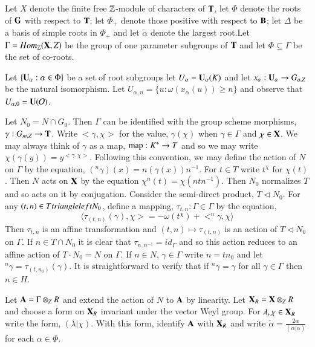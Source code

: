 Let $X$ denote the finite free $\mathbb{Z}$-module of characters of $\mathbf{T}$, let $\Phi$ denote the roots of $\mathbf{G}$ with respect to $\mathbf{T}$;  let $\Phi_{+}$ denote those positive with respect to $\mathbf{B}$; let $\Delta$ be a basis of simple roots in $\Phi_{+}$ and let $\tilde{\alpha}$ denote the largest root.\pageoriginale Let $\Gamma = Hom_{\mathbb{Z}}(\mathbf{X}, Z)$ be the group of one parameter subgroups of $\mathbf{T}$ and let $\Phi \subseteq \Gamma$ be the set of co-roots.

Let $\{\mathbf{U}_{\alpha} : \alpha \in \Phi\}$ be a set of root subgroups let $U_{\alpha} = \mathbf{U}_{\alpha}(K)$ and let $x_{\alpha} : \mathbf{U}_{\alpha}\rightarrow G_{a, Z}$ be the natural isomorphism. Let $U_{\alpha,n} = \{u: \omega(x_{\alpha}(u)) \geq n \}$ and observe that $U_{\alpha, 0}=\mathbf{U}(\mathcal{O})$.

Let $N_{0} = N \cap G_{0}$. Then $\Gamma$ can be identified with the group scheme morphisms, $\gamma : G_{m, Z} \rightarrow \mathbf{T}$. Write $<\gamma, \chi>$ for the value, $\gamma(\chi)$ when $\gamma  \in \Gamma$ and $ \chi \in \mathbf{X}$. We  may always think of $\gamma$ as a map, $\operatorname{map}: K^{*}\rightarrow T$ and so we may write $\chi(\gamma(y)) = y^{<\gamma, \chi>}$. Following this convention, we may define the action of $N$ on $\Gamma$ by the equation, $(^{n}\gamma)(x) = n(\gamma(x))n^{-1}$. For $t \in T$ write $t^{\chi}$ for $\chi(t)$. Then $N$ acts on $\mathbf{X}$ by the equation $\chi^{n}(t) = \chi(ntn^{-1})$. Then $N_{0}$  normalizes $T$ and so acts on it by conjugation. Consider the semi-direct product, $T\triangleleft N_{0}$. For any $(t, n)\in T \\triangleleft N_{0}$, define a mapping, $\tau_{t, n} : \Gamma \in \Gamma$ by the equation,
$$
\langle \tau_{(t, n)}(\gamma), \chi > = -\omega(t^{\chi}) + <^{n}\gamma, \chi\rangle
$$
Then $\tau_{t, n}$ is an affine transformation and $(t, n)\mapsto \tau_{(t,n)}$ is an action of $T \triangleleft N_{0}$ on $\Gamma$. If $n\in T \cap N_{0}$ it is clear that $\tau_{n,n^{-1}}= id_{\Gamma}$ and so this action reduces to an affine action of $T \cdot N_{0} = N$ on $\Gamma$. If $n \in N$, $\gamma \in \Gamma$ write $n=tn_{0}$ and let $^{n}\gamma =\tau_{(t, n_{0})}(\gamma)$. It is straightforward to verify that if $^{n}\gamma = \gamma$ for all $\gamma \in \Gamma$ then $n \in H$. 

Let $\mathbf{A} = \Gamma \otimes_{Z} R$ and extend the action of $N$ to $\mathbf{A}$ by linearity. Let $\mathbf{X}_{R} = \mathbf{X} \otimes_{Z} R $ and choose a form on $\mathbf{X}_{R}$ invariant under the vector Weyl group. For $\lambda, \chi \in \mathbf{X}_{R}$ write the form, $(\lambda|\chi)$. With this form, identify $\mathbf{A}$ with $\mathbf{X}_{R}$ and write $\check{\alpha} = \frac{2\alpha}{(\alpha | \alpha)}$ for each $\alpha \in \Phi$.

